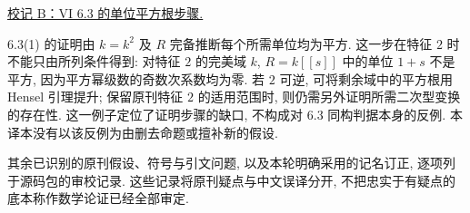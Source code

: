\medskip
\noindent\hypertarget{editorial-vi-square-root}{}\underline{校记 B：VI 6.3 的单位平方根步骤.}

6.3(1) 的证明由 $k=k^2$ 及 $R$ 完备推断每个所需单位均为平方.
这一步在特征 $2$ 时不能只由所列条件得到: 对特征 $2$ 的完美域 $k$,
$R=k[[s]]$ 中的单位 $1+s$ 不是平方, 因为平方幂级数的奇数次系数均为零.
若 $2$ 可逆, 可将剩余域中的平方根用 Hensel 引理提升;
保留原刊特征 $2$ 的适用范围时, 则仍需另外证明所需二次型变换的存在性.
这一例子定位了证明步骤的缺口, 不构成对 6.3 同构判据本身的反例.
本译本没有以该反例为由删去命题或擅补新的假设.

其余已识别的原刊假设、符号与引文问题, 以及本轮明确采用的记名订正,
逐项列于源码包的审校记录. 这些记录将原刊疑点与中文误译分开,
不把忠实于有疑点的底本称作数学论证已经全部审定.
